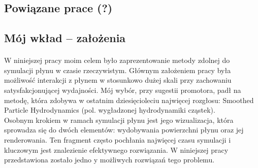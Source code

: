 \subsection{Powiązane prace (?)}
\paragraph{}
\par

\subsection{Mój wkład -- założenia}
\paragraph{}
W niniejszej pracy moim celem było zaprezentowanie metody zdolnej do symulacji płynu w czasie rzeczywistym. Głównym założeniem pracy była możliwość interakcji z płynem w stosunkowo dużej skali przy zachowaniu satysfakcjonującej wydajności. Mój wybór, przy sugestii promotora, padł na metodę, która zdobywa w ostatnim dziesięcioleciu najwięcej rozgłosu: Smoothed Particle Hydrodynamics (pol. wygładzonej hydrodynamiki cząstek).\\
Osobnym krokiem w ramach symulacji płynu jest jego wizualizacja, która sprowadza się do dwóch elementów: wydobywania powierzchni płynu oraz jej renderowania. Ten fragment często pochłania najwięcej czasu symulacji i kluczowym jest znalezienie efektywnego rozwiązania. W niniejszej pracy przedstawiona zostało jedno y możliwych rozwiązań tego problemu.
\par
